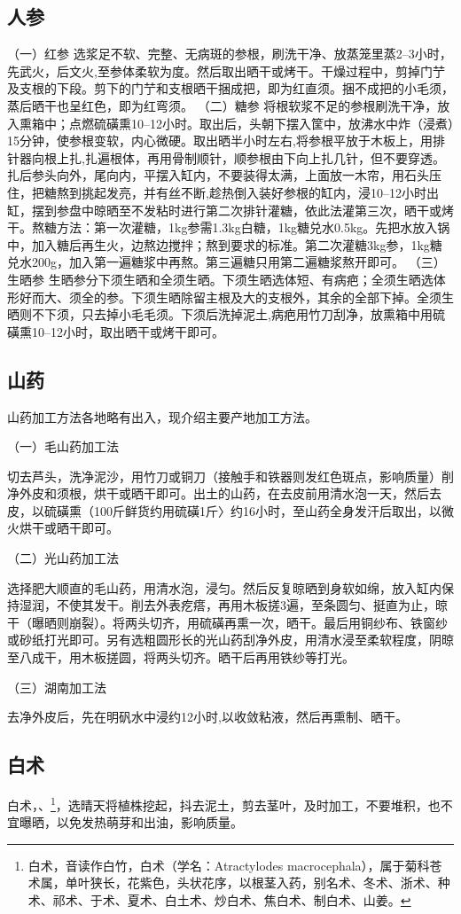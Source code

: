 \documentclass{ctexbook}
\begin{document}
\subsection{人参}
（一）红参
选浆足不软、完整、无病斑的参根，刷洗干净、放蒸笼里蒸2--3小时，先武火，后文火,至参体柔软为度。然后取出晒干或烤干。干燥过程中，剪掉门艼及支根的下段。剪下的门艼和支根晒干捆成把，即为红直须。捆不成把的小毛须，蒸后晒干也呈红色，即为红弯须。
（二）糖参
将根软浆不足的参根刷洗干净，放入熏箱中；点燃硫磺熏10--12小时。取出后，头朝下摆入筐中，放沸水中炸（浸煮）15分钟，使参根变软，内心微硬。取出晒半小时左右,将参根平放于木板上，用排针器向根上扎,扎遍根体，再用骨制顺针，顺参根由下向上扎几针，但不要穿透。扎后参头向外，尾向内，平摆入缸内，不要装得太满，上面放一木帘，用石头压住，把糖熬到挑起发亮，并有丝不断,趁热倒入装好参根的缸内，浸10--12小时出缸，摆到参盘中晾晒至不发粘时进行第二次排针灌糖，依此法灌第三次，晒干或烤干。熬糖方法：第一次灌糖，1kg参需1.3kg白糖，1kg糖兑水0.5kg。先把水放入锅中，加入糖后再生火，边熬边搅拌；熬到要求的标准。第二次灌糖3kg参，1kg糖兑水200g，加入第一遍糖浆中再熬。第三遍糖只用第二遍糖浆熬开即可。
（三）生晒参
生晒参分下须生晒和全须生晒。下须生晒选体短、有病疤；全须生晒选体形好而大、须全的参。下须生晒除留主根及大的支根外，其余的全部下掉。全须生晒则不下须，只去掉小毛毛须。下须后洗掉泥土,病疤用竹刀刮净，放熏箱中用硫磺熏10--12小时，取出晒干或烤干即可。
\subsection{山药}
山药加工方法各地略有出入，现介绍主要产地加工方法。

（一）毛山药加工法

切去芦头，洗净泥沙，用竹刀或铜刀（接触手和铁器则发红色斑点，影响质量）削净外皮和须根，烘干或晒干即可。出土的山药，在去皮前用清水泡一天，然后去皮，以硫磺熏（100斤鲜货约用硫磺1斤〉约16小时，至山药全身发汗后取出，以微火烘干或晒干即可。

（二）光山药加工法

选择肥大顺直的毛山药，用清水泡，浸匀。然后反复晾晒到身软如绵，放入缸内保持湿润，不使其发干。削去外表疙瘩，再用木板搓3遍，至条圆匀、挺直为止，晾干（曝晒则崩裂）。将两头切齐，用硫磺再熏一次，晒干。最后用铜纱布、铁窗纱或砂纸打光即可。另有选粗圆形长的光山药刮净外皮，用清水浸至柔软程度，阴晾至八成干，用木板搓圆，将两头切齐。晒干后再用铁纱等打光。

（三）湖南加工法

去净外皮后，先在明矾水中浸约12小时,以收敛粘液，然后再熏制、晒干。
\subsection{白术}
白术，、\footnote{白术，音读作白竹，白术（学名：Atractylodes macrocephala），属于菊科苍术属，单叶狭长，花紫色，头状花序，以根茎入药，别名术、冬术、浙术、种术、祁术、于术、夏术、白土术、炒白术、焦白术、制白术、山姜。}，选晴天将植株挖起，抖去泥土，剪去茎叶，及时加工，不要堆积，也不宜曝晒，以免发热萌芽和出油，影响质量。
\end{document}
